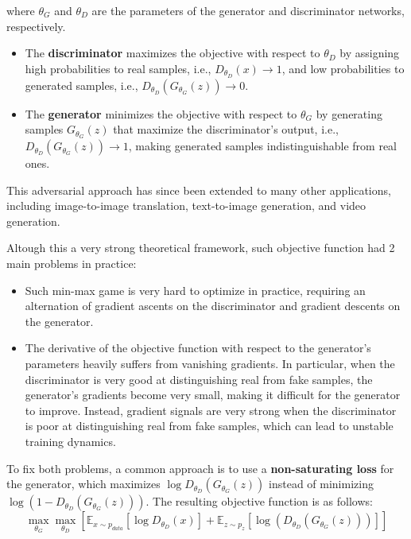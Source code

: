 where $\theta_G$ and $\theta_D$ are the parameters of the generator and discriminator networks, respectively.

\begin{itemize}
    \item The \textbf{discriminator} maximizes the objective with respect to $\theta_D$ by assigning high probabilities to real samples, i.e., $D_{\theta_D}(x)\rightarrow 1$, and low probabilities to generated samples, i.e., $D_{\theta_D}(G_{\theta_G}(z))\rightarrow 0$.

    \item The \textbf{generator} minimizes the objective with respect to $\theta_G$ by generating samples $G_{\theta_G}(z)$ that maximize the discriminator's output, i.e., $D_{\theta_D}(G_{\theta_G}(z))\rightarrow 1$, making generated samples indistinguishable from real ones.
\end{itemize}

This adversarial approach has since been extended to many other applications, including image-to-image translation, text-to-image generation, and video generation.

Altough this a very strong theoretical framework, such objective function had 2 main problems in practice:
\begin{itemize}
    \item Such min-max game is very hard to optimize in practice, requiring an alternation of gradient ascents on the discriminator and gradient descents on the generator.
    
    \item The derivative of the objective function with respect to the generator's parameters heavily suffers from vanishing gradients. 
    In particular, when the discriminator is very good at distinguishing real from fake samples, the generator's gradients become very small, making it difficult for the generator to improve.
    Instead, gradient signals are very strong when the discriminator is poor at distinguishing real from fake samples, which can lead to unstable training dynamics.
\end{itemize}

To fix both problems, a common approach is to use a \textbf{non-saturating loss} for the generator, which maximizes $\log D_{\theta_D}(G_{\theta_G}(z))$ instead of minimizing $\log(1 - D_{\theta_D}(G_{\theta_G}(z)))$.
The resulting objective function is as follows:
\begin{equation}
    \max_{\theta_G} \max_{\theta_D} \left[ \mathbb{E}_{x \sim p_{data}}[\log D_{\theta_D}(x)] + \mathbb{E}_{z \sim p_{z}}[ \log(D_{\theta_D}(G_{\theta_G}(z)))] \right]
\end{equation}

